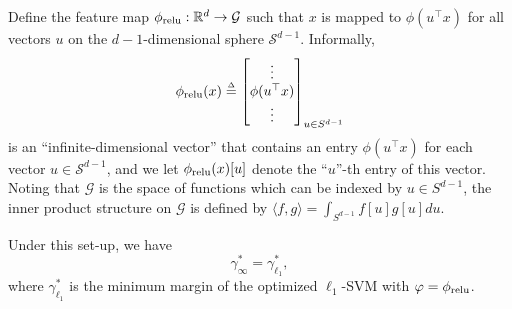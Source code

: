 \begin{theorem}\label{lec8:thm:thm8.5}
Define the feature map $\phi_{\textup{relu}}: \mathbb{R}^d \to \mathcal{G}$ such that $x$ is mapped to $\phi(u^\top x)$ for all vectors $u$ on the $d-1$-dimensional sphere $\mathcal{S}^{d-1}$. Informally, 
$$\phirelu(x) \defeq \begin{bmatrix} \vdots \\ \phi(u^\top x) \\ \vdots \end{bmatrix}_{u\in S^{d-1}}$$
is an ``infinite-dimensional vector'' that contains an entry $\phi(u^\top x)$ for each vector $u \in \mathcal{S}^{d-1}$, and we let $\phi_{\textup{relu}}(x)[u]$ denote the ``$u$''-th entry of this vector. Noting that $\mathcal{G}$ is the space of functions which can be indexed by $u \in S^{d-1}$, the inner product structure on $\mathcal{G}$ is defined by $\langle f, g \rangle = \int_{S^{d-1}} f[u]g[u] du$.

Under this set-up, we have
\begin{equation}
\gamma_{\infty}^* = \gamma_{\ell_1}^*,
\end{equation}
where $\gamma_{\ell_1}^*$ is the minimum margin of the optimized $\ell_1$-SVM with $\varphi = \phi_{\textup{relu}}$.
\end{theorem}

